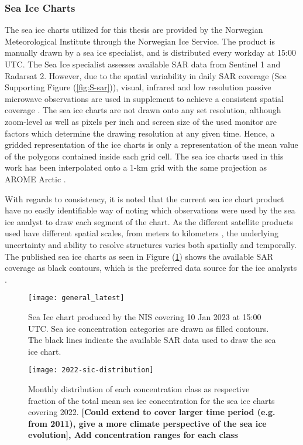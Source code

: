 \documentclass[../main/thesis.tex]{subfiles}
\begin{document}
\subsubsection{Sea Ice Charts}
\label{sec:sea-ice-charts}
The sea ice charts utilized for this thesis are provided by the Norwegian Meteorological Institute through the Norwegian Ice Service. The product is manually drawn by a sea ice specialist, and is distributed every workday at 15:00 UTC. The Sea Ice specialist assesses available SAR data from Sentinel 1 and Radarsat 2. However, due to the spatial variability in daily SAR coverage (See Supporting Figure (\ref{fig:S-sar})), visual, infrared and low resolution passive microwave observations are used in supplement to achieve a consistent spatial coverage \citep{Dinessen2020}. The sea ice charts are not drawn onto any set resolution, although zoom-level as well as pixels per inch and screen size of the used monitor are factors which determine the drawing resolution at any given time. Hence, a gridded representation of the ice charts is only a representation of the mean value of the polygons contained inside each grid cell. The sea ice charts used in this work has been interpolated onto a 1-km grid with the same projection as AROME Arctic \citep{Mueller2017}.

With regards to consistency, it is noted that the current sea ice chart product have no easily identifiable way of noting which observations were used by the sea ice analyst to draw each segment of the chart. As the different satellite products used have different spatial scales, from meters to kilometers \citep{Dinessen2020}, the underlying uncertainty and ability to resolve structures varies both spatially and temporally. The published sea ice charts as seen in Figure (\ref{fig:icechart}) shows the available SAR coverage as black contours, which is the preferred data source for the ice analysts \citep{Dinessen2020}. 

\begin{figure}
    \centering
    \texttt{[image: general\_latest]}
    \caption{\label{fig:icechart}Sea Ice chart produced by the NIS covering 10 Jan 2023 at 15:00 UTC. Sea ice concentration categories are drawn as filled contours. The black lines indicate the available SAR data used to draw the sea ice chart.}
\end{figure}

\begin{figure}
    \centering
    \texttt{[image: 2022-sic-distribution]}
    \caption{\label{fig:2022-areadist-sic}Monthly distribution of each concentration class as respective fraction of the total mean sea ice concentration for the sea ice charts covering 2022. \textbf{[Could extend to cover larger time period (e.g. from 2011), give a more climate perspective of the sea ice evolution], Add concentration ranges for each class}}
\end{figure}
\end{document}
